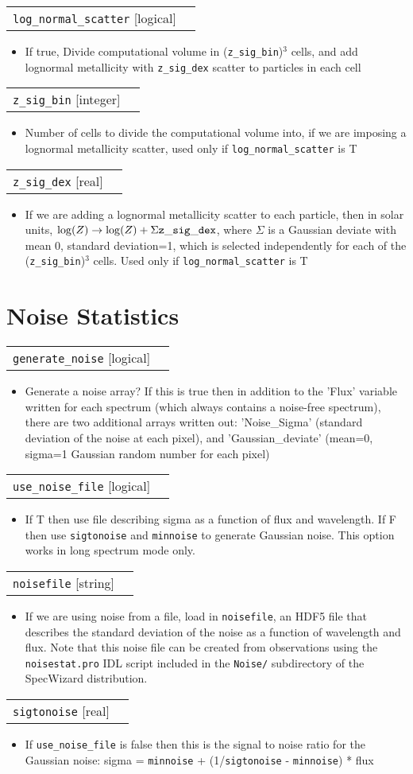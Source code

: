\documentclass{report}
\makeatletter
\newcommand{\paramdefinition}[3]{
\begin{tabular*}{\textwidth}{l@{\extracolsep{\fill}}r}
		{\tt #1} [{\sc #2}]& #3 \\
\end{tabular*}}
\newcommand{\paramdescription}[1]{
\begin{itemize}
\item #1
\end{itemize}\vspace{0.2cm}}
\makeatother
\begin{document}
\paramdefinition{log\_normal\_scatter}{logical}{ }
\paramdescription{If true, Divide computational volume in ({\tt z\_sig\_bin})$^3$ cells, and add lognormal metallicity with {\tt z\_sig\_dex} scatter to particles in each cell}

\paramdefinition{z\_sig\_bin}{integer}{}
\paramdescription{Number of cells to divide the computational volume into, if we are imposing a lognormal metallicity scatter, used only if {\tt log\_normal\_scatter} is T}

\paramdefinition{z\_sig\_dex}{real}{}
\paramdescription{If we are adding a lognormal metallicity scatter to each particle, then in solar units, $\log(Z) \rightarrow \log(Z)+\Sigma {\tt z\_sig\_dex}$, where $\Sigma$ is a Gaussian deviate with mean 0, standard deviation=1, which is selected independently for each of the ({\tt z\_sig\_bin})$^3$ cells. Used only if {\tt log\_normal\_scatter} is T}

\section{Noise Statistics}
\paramdefinition{generate\_noise}{logical}{}
\paramdescription{Generate a noise array?  If this is true then in addition to the 'Flux' variable written for each spectrum (which always contains a noise-free spectrum), there are two additional arrays written out: 'Noise\_Sigma' (standard deviation of the noise at each pixel), and 'Gaussian\_deviate' (mean=0, sigma=1 Gaussian random number for each pixel)}

\paramdefinition{use\_noise\_file}{logical}{}
\paramdescription{If T then use file describing sigma as a function of flux and wavelength.  If F then use {\tt sigtonoise} and {\tt minnoise} to generate Gaussian noise.  This option works in long spectrum mode only.}

\paramdefinition{noisefile}{string}{}
\paramdescription{If we are using noise from a file, load in {\tt noisefile}, an HDF5 file that describes the standard deviation of the noise as a function of wavelength and flux.  Note that this noise file can be created from observations using the {\tt noisestat.pro} IDL script included in the {\tt Noise/} subdirectory of the SpecWizard distribution.}

\paramdefinition{sigtonoise}{real}{}
\paramdescription{If {\tt use\_noise\_file} is false then this is the signal to noise ratio for the Gaussian noise: sigma = {\tt minnoise} + (1/{\tt sigtonoise} - {\tt minnoise}) * flux}
\end{document}
